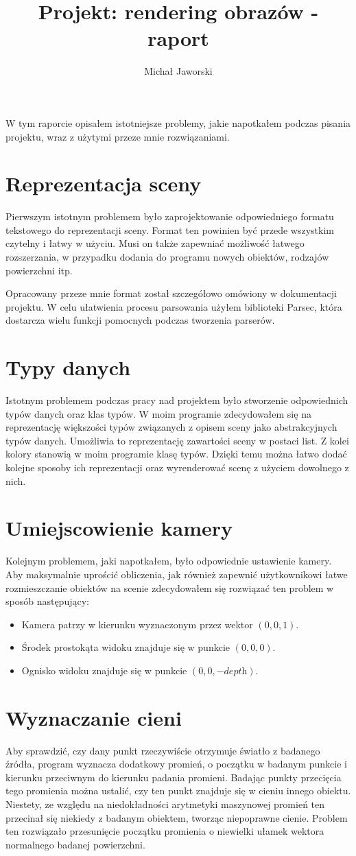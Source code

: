 \documentclass[11pt,a4paper]{article}
\title{\vspace{-2.0cm}\textbf{Projekt: rendering obrazów - raport}}
\author{Michał Jaworski}
\begin{document}
\maketitle
W tym raporcie opisałem istotniejsze problemy, jakie napotkałem podczas pisania projektu, wraz z użytymi przeze mnie rozwiązaniami.
\section{Reprezentacja sceny}
Pierwszym istotnym problemem było zaprojektowanie odpowiedniego formatu tekstowego do reprezentacji sceny. Format ten powinien być przede wszystkim czytelny i łatwy w użyciu. Musi on także zapewniać możliwość łatwego rozszerzania, w przypadku dodania do programu nowych obiektów, rodzajów powierzchni itp.

Opracowany przeze mnie format został szczegółowo omówiony w dokumentacji projektu. W celu ułatwienia procesu parsowania użyłem biblioteki Parsec, która dostarcza wielu funkcji pomocnych podczas tworzenia parserów.
\section{Typy danych}
Istotnym problemem podczas pracy nad projektem było stworzenie odpowiednich typów danych oraz klas typów. W moim programie zdecydowałem się na reprezentację większości typów związanych z opisem sceny jako abstrakcyjnych typów danych. Umożliwia to reprezentację zawartości sceny w postaci list. Z kolei kolory stanowią w moim programie klasę typów. Dzięki temu można łatwo dodać kolejne sposoby ich reprezentacji oraz wyrenderować scenę z użyciem dowolnego z nich.
\section{Umiejscowienie kamery}
Kolejnym problemem, jaki napotkałem, było odpowiednie ustawienie kamery. Aby maksymalnie uprościć obliczenia, jak również zapewnić użytkownikowi łatwe rozmieszczanie obiektów na scenie zdecydowałem się rozwiązać ten problem w sposób następujący:
\begin{itemize}
\item Kamera patrzy w kierunku wyznaczonym przez wektor $(0, 0, 1)$.
\item Środek prostokąta widoku znajduje się w punkcie $(0, 0, 0)$.
\item Ognisko widoku znajduje się w punkcie $(0, 0, -\textit{depth})$.
\end{itemize}
\section{Wyznaczanie cieni}
Aby sprawdzić, czy dany punkt rzeczywiście otrzymuje światło z badanego źródła, program wyznacza dodatkowy promień, o początku w badanym punkcie i kierunku przeciwnym do kierunku padania promieni. Badając punkty przecięcia tego promienia można ustalić, czy ten punkt znajduje się w cieniu innego obiektu. Niestety, ze względu na niedokładności arytmetyki maszynowej promień ten przecinał się niekiedy z badanym obiektem, tworząc niepoprawne cienie. Problem ten rozwiązało przesunięcie początku promienia o niewielki ułamek wektora normalnego badanej powierzchni.
\end{document}
